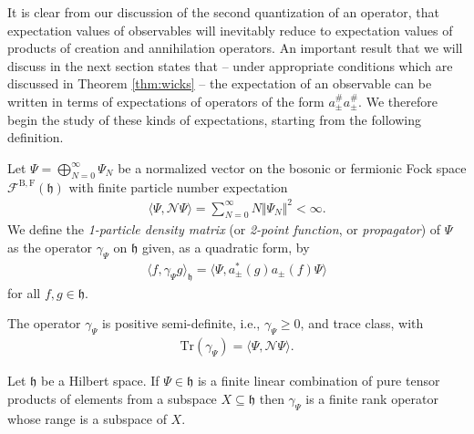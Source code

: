 It is clear from our discussion of the second quantization of an operator, that expectation
values of observables will inevitably reduce to expectation values of products of
creation and annihilation operators. An important result that we will discuss in the next
section states that -- under appropriate conditions which are discussed in Theorem
\ref{thm:wicks} -- the expectation of an observable can be written in terms of expectations of
operators of the form $a_\pm^\#a_\pm^\#$. We therefore begin the study of these kinds of
expectations, starting from the following definition.

\begin{definition}
	Let $\Psi=\bigoplus_{N=0}^\infty\Psi_N$ be a normalized vector on the bosonic or fermionic
	Fock space $\mathcal{F}^\mathrm{B,F}(\mathfrak{h})$ with finite particle number expectation
	\begin{align*}
		\langle\Psi,\mathcal{N}\Psi\rangle = \sum_{N=0}^\infty N\Vert\Psi_N\Vert^2 < \infty.
	\end{align*}
	We define the \textit{1-particle density matrix} (or \textit{2-point function}, or
	\textit{propagator}) of $\Psi$ as the operator $\gamma_\Psi$ on $\mathfrak{h}$ given, as a
	quadratic form, by
	\begin{align*}
		\langle f,\gamma_\Psi g\rangle_\mathfrak{h} = \langle \Psi,a^*_\pm(g)a_\pm(f)\Psi\rangle
	\end{align*}
	for all $f,g\in\mathfrak{h}$.
\end{definition}

\begin{proposition}
	The operator $\gamma_\Psi$ is positive semi-definite, i.e., $\gamma_\Psi\geq0$, and trace
	class, with
	\begin{align*}
		\mathrm{Tr}(\gamma_\Psi) = \langle \Psi,\mathcal{N}\Psi \rangle.
	\end{align*}
\end{proposition}

\begin{lemma}
	\label{finite-rank-1pdm}
	Let $\mathfrak{h}$ be a Hilbert space. If $\Psi\in\mathfrak{h}$ is a finite linear
	combination of pure tensor products of elements from a subspace $X\subseteq\mathfrak{h}$
	then $\gamma_\Psi$ is a finite rank operator whose range is a subspace of $X$.
\end{lemma}

